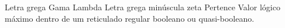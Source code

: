 \begin{simbolos}
\simb{$\Gamma$} Letra grega Gama
\simb{$\Lambda$} Lambda
\simb{$\zeta$} Letra grega minúscula zeta
\simb{$\in$} Pertence
\simb{$\top$} Valor lógico máximo dentro de um reticulado regular
  booleano ou quasi-booleano.
\end{simbolos}
\cleardoublepage